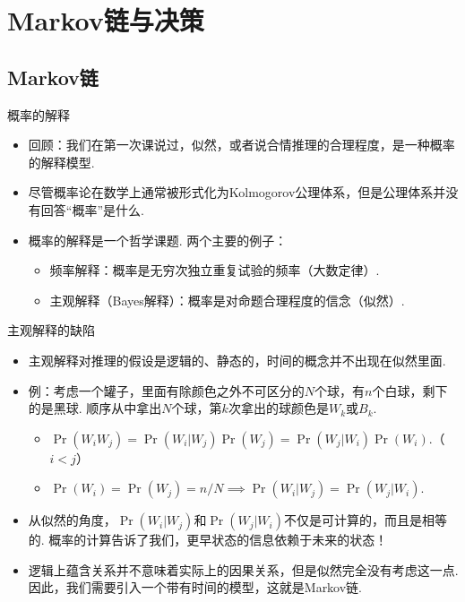 \chapter{Markov链与决策}\label{chap:markov-chain}


\section{Markov链}
\begin{frame}{概率的解释}
\begin{itemize}
    \item 回顾：我们在第一次课说过，似然，或者说合情推理的合理程度，是一种概率的解释模型.
    \item 尽管概率论在数学上通常被形式化为Kolmogorov公理体系，但是公理体系并没有回答``概率''是什么.
    \item 概率的解释是一个哲学课题. 两个主要的例子：
    \begin{itemize}
    \item 频率解释：概率是无穷次独立重复试验的频率（大数定律）.
    \item 主观解释（Bayes解释）：概率是对命题合理程度的信念（似然）.
    \end{itemize}
\end{itemize}
\end{frame}

\begin{frame}{主观解释的缺陷}
\begin{itemize}
    \item 主观解释对推理的假设是逻辑的、静态的，时间的概念并不出现在似然里面.
    \item 例：考虑一个罐子，里面有除颜色之外不可区分的$N$个球，有$n$个白球，剩下的是黑球. 顺序从中拿出$N$个球，第$k$次拿出的球颜色是$W_k$或$B_k$.
    \begin{itemize}
        \item $\Pr(W_iW_j)=\Pr(W_i|W_j)\Pr(W_j)=\Pr(W_j|W_i)\Pr(W_i)$.（$i<j$）
        \item $\Pr(W_i)=\Pr(W_j)=n/N\implies\Pr(W_i|W_j)=\Pr(W_j|W_i)$.
    \end{itemize}
    \item 从似然的角度，$\Pr(W_i|W_j)$和$\Pr(W_j|W_i)$不仅是可计算的，而且是相等的. 概率的计算告诉了我们，更早状态的信息依赖于未来的状态！
    \item 逻辑上蕴含关系并不意味着实际上的因果关系，但是似然完全没有考虑这一点. 因此，我们需要引入一个带有时间的模型，这就是Markov链.
\end{itemize}
\end{frame}

